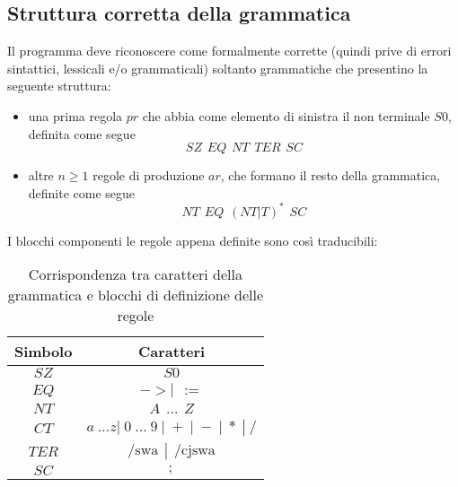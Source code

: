\documentclass[12pt]{article}
\begin{document}
\subsection{Struttura corretta della grammatica}\label{struttura}
Il programma deve riconoscere come formalmente corrette (quindi prive di errori sintattici, lessicali e/o grammaticali) soltanto grammatiche che presentino la seguente struttura:
\begin{itemize}
\item una prima regola $pr$ che abbia come elemento di sinistra il non terminale $S0$, definita come segue
$$
SZ \hspace{5pt} EQ \hspace{5pt} NT \hspace{5pt} TER \hspace{5pt} SC
$$
\item altre $n \geq 1$ regole di produzione $ar$, che formano il resto della grammatica, definite come segue
$$
NT \hspace{5pt} EQ \hspace{5pt} \left( NT \left| T \right. \right)^* \hspace{5pt} SC
$$
\end{itemize}
I blocchi componenti le regole appena definite sono così traducibili:
\begin{table}[h]
\centering
\begin{tabular}{|c|c|}
\hline
\textbf{Simbolo} & \textbf{Caratteri} \\
\hline
$SZ$ & $S0$ \\
\hline
$EQ$ & $-> \left| \hspace{5pt} := \right.$ \\
\hline
$NT$ & $A \hspace{5pt} \dots \hspace{5pt} Z$ \\
\hline
$CT$ & $a \hspace{3pt} \dots z \left| \hspace{3pt} 0 \hspace{3pt} \dots \hspace{3pt} 9 \hspace{3pt} \right| \hspace{3pt} + \hspace{3pt} \left| \hspace{3pt} - \hspace{3pt} \right| \hspace{3pt} * \hspace{3pt} \left| \hspace{3pt} / \right.$ \\
\hline
$TER$ & $\text{/swa} \hspace{5pt} \left| \hspace{5pt} \text{/cjswa} \right.$ \\
\hline
$SC$ & $;$ \\
\hline
\end{tabular}
\caption{Corrispondenza tra caratteri della grammatica e blocchi di definizione delle regole}
\end{table}
\end{document}
